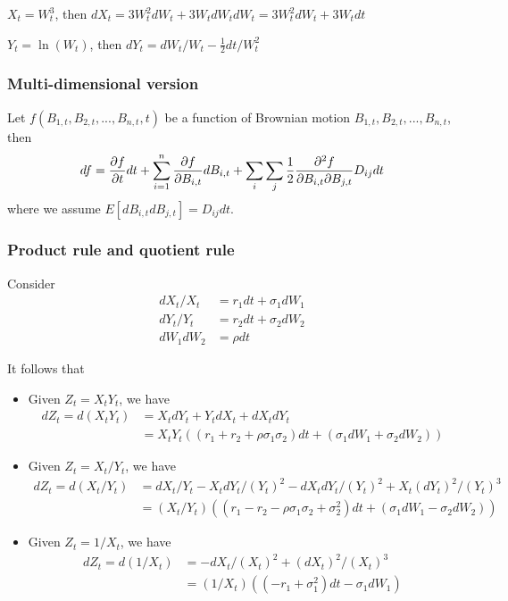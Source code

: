 \begin{refsection}
\begin{example}
	$X_t = W_t^3$, then $dX_t = 3W_t^2 dW_t + 3W_t dW_tdW_t = 3W_t^2 dW_t + 3W_t dt$
\end{example}


\begin{example}
	$Y_t = \ln(W_t)$, then $dY_t = dW_t/W_t - \frac{1}{2} dt/W_t^2$
\end{example}
\subsubsection{Multi-dimensional version}
\begin{lemma}
	Let $f(B_{1,t},B_{2,t},...,B_{n,t},t)$ be a function of Brownian motion $B_{1,t},B_{2,t}, ...,B_{n,t}$, then
	$$df = \frac{\partial f}{\partial t}dt + \sum_{i=1}^n\frac{\partial f}{\partial B_{i,t}}dB_{i,t} + \sum_{i}\sum_j\frac{1}{2}\frac{\partial^2 f}{\partial B_{i,t}\partial B_{j,t}}D_{ij}dt$$
	where we assume $E[dB_{i,t}dB_{j,t}] = D_{ij}dt$.
\end{lemma}


\subsubsection{Product rule and quotient rule}
\begin{lemma}\cite[79]{wiersema2008brownian}\label{ch:theory-of-stochastic-process:th:ItoRuleProductRuleQuotientRule}
	Consider
	\begin{align*}
	dX_t/X_t &= r_1dt + \sigma_1dW_1\\
	dY_t/Y_t &= r_2dt + \sigma_2dW_2\\
	dW_1dW_2 &= \rho dt
	\end{align*}
	
	It follows that
	
	\begin{itemize}
		\item Given $Z_t = X_t Y_t$, we have 
		\begin{align*}
		dZ_t = d(X_tY_t) &= X_tdY_t + Y_tdX_t + dX_tdY_t \\
		&= X_tY_t( (r_1+r_2 + \rho \sigma_1 \sigma_2)dt + (\sigma_1dW_1 + \sigma_2dW_2))
		\end{align*}
		\item Given $Z_t = X_t/Y_t$, we have 
		\begin{align*}
		dZ_t = d(X_t/Y_t) &=dX_t/Y_t - X_tdY_t/(Y_t)^2 - dX_tdY_t/(Y_t)^2 + X_t(dY_t)^2/(Y_t)^3 \\
		&= (X_t/Y_t)((r_1-r_2 - \rho \sigma_1 \sigma_2 + \sigma^2_2)dt + (\sigma_1dW_1 - \sigma_2dW_2))
		\end{align*}
		\item Given $Z_t = 1/X_t$, we have
		\begin{align*}
		dZ_t = d(1/X_t) &= -dX_t/(X_t)^2 + (dX_t)^2/(X_t)^3 \\
		&= (1/X_t)(( - r_1 + \sigma_1^2)dt - \sigma_1dW_1)
		\end{align*}
		

\end{itemize}
\end{lemma}
\end{refsection}
